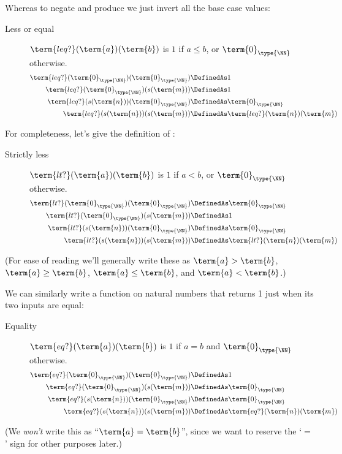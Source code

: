 %
Whereas to negate  and produce  we just invert all the base case values:
\begin{description}
\item[Less or equal]  $\term{leq?}(\term{a})(\term{b})$ is $1$ if $a \leq b$, or $\term{0}_{\type{\NN}}$ otherwise.
 \begin{align*}
\term{leq?}
(\term{0}_{\type{\NN}})
(\term{0}_{\type{\NN}})
&\DefinedAs 
1
\\
\term{leq?}(\term{0}_{\type{\NN}})(s(\term{m})) 
&\DefinedAs 
1
\\
\term{leq?}(s(\term{n}))(\term{0}_{\type{\NN}}) &\DefinedAs
\term{0}_{\type{\NN}}
\\
\term{leq?}(s(\term{n}))(s(\term{m})) &\DefinedAs
\term{leq?}(\term{n})(\term{m})
\end{align*}
\end{description}
%
For completeness, let's give the definition of :
\begin{description}
\item[Strictly less]  $\term{lt?}(\term{a})(\term{b})$ is $1$ if $a < b$, or $\term{0}_{\type{\NN}}$ otherwise.
 \begin{align*}
\term{lt?}
(\term{0}_{\type{\NN}})
(\term{0}_{\type{\NN}})
&\DefinedAs 
\term{0}_{\type{\NN}}
\\
\term{lt?}(\term{0}_{\type{\NN}})(s(\term{m})) 
&\DefinedAs 
1
\\
\term{lt?}(s(\term{n}))(\term{0}_{\type{\NN}}) &\DefinedAs
\term{0}_{\type{\NN}}
\\
\term{lt?}(s(\term{n}))(s(\term{m})) &\DefinedAs
\term{lt?}(\term{n})(\term{m})
\end{align*}
\end{description}

(For ease of reading we'll generally write these as
$\term{a} > \term{b}$, 
$\term{a} \geq \term{b}$, 
$\term{a} \leq \term{b}$, and 
$\term{a} < \term{b}$.)


We can similarly write a function on natural numbers that returns 1 just when its two inputs are equal:
%
\begin{description}
\item[Equality] $\term{eq?}(\term{a})(\term{b})$ is $1$ if $a=b$ and $\term{0}_{\type{\NN}}$ otherwise.
\begin{align*}
\term{eq?}(\term{0}_{\type{\NN}})(\term{0}_{\type{\NN}}) &\DefinedAs 
1
\\
\term{eq?}(\term{0}_{\type{\NN}})(s(\term{m})) &\DefinedAs 
\term{0}_{\type{\NN}}
\\
\term{eq?}(s(\term{n}))(\term{0}_{\type{\NN}}) &\DefinedAs
\term{0}_{\type{\NN}}
\\
\term{eq?}(s(\term{n}))(s(\term{m})) &\DefinedAs
\term{eq?}(\term{n})(\term{m})
\end{align*}
\end{description}
(We \emph{won't} write this as ``$\term{a} = \term{b}$'', since we want to reserve the `$=$' sign for other purposes later.)


